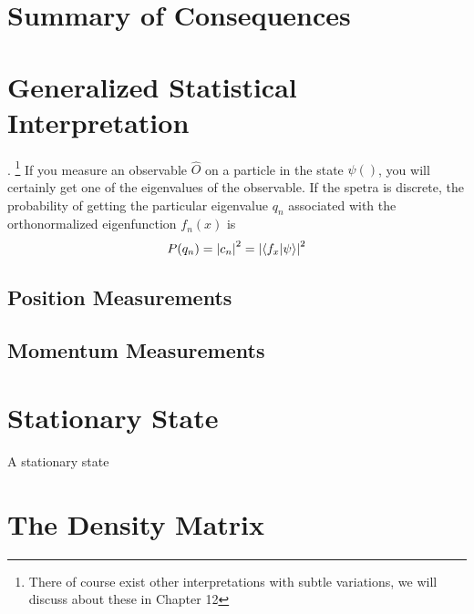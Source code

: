 \section{Summary of Consequences}

\section{Generalized Statistical Interpretation}
. \footnote{There of course exist other interpretations with subtle variations, we will discuss about these in Chapter 12} If you measure an observable $\hat{O}$ on a particle in the state $\psi()$, you will certainly get one of the eigenvalues of the observable. If the spetra is discrete, the probability of getting the particular eigenvalue $q_{n}$ associated with the orthonormalized eigenfunction $f_{n}(x)$ is
\begin{equation}
	P(q_{n}) = \abs{c_{n}}^{2} = \abs{\braket{f_{x}}{\psi}}^{2}
\end{equation}
\subsection{Position Measurements}

\subsection{Momentum Measurements}

\section{Stationary State}
A  stationary state 
\section{The Density Matrix}
